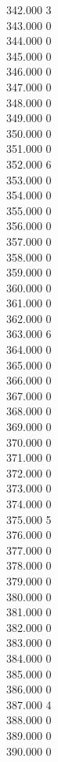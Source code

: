 { 342.000	3 \\
 343.000	0 \\
 344.000	0 \\
 345.000	0 \\
 346.000	0 \\
 347.000	0 \\
 348.000	0 \\
 349.000	0 \\
 350.000	0 \\
 351.000	0 \\
 352.000	6 \\
 353.000	0 \\
 354.000	0 \\
 355.000	0 \\
 356.000	0 \\
 357.000	0 \\
 358.000	0 \\
 359.000	0 \\
 360.000	0 \\
 361.000	0 \\
 362.000	0 \\
 363.000	6 \\
 364.000	0 \\
 365.000	0 \\
 366.000	0 \\
 367.000	0 \\
 368.000	0 \\
 369.000	0 \\
 370.000	0 \\
 371.000	0 \\
 372.000	0 \\
 373.000	0 \\
 374.000	0 \\
 375.000	5 \\
 376.000	0 \\
 377.000	0 \\
 378.000	0 \\
 379.000	0 \\
 380.000	0 \\
 381.000	0 \\
 382.000	0 \\
 383.000	0 \\
 384.000	0 \\
 385.000	0 \\
 386.000	0 \\
 387.000	4 \\
 388.000	0 \\
 389.000	0 \\
 390.000	0 \\
}
